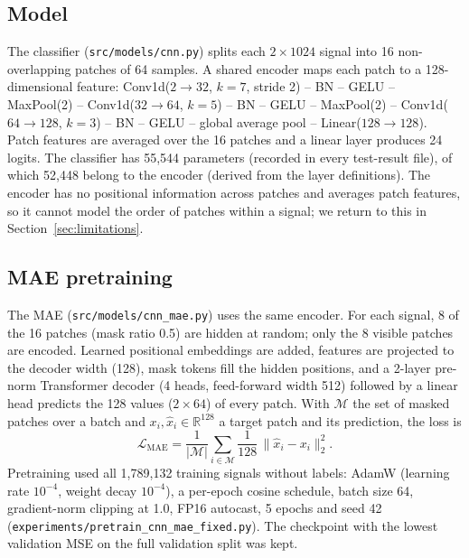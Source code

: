 \documentclass[11pt,a4paper]{article}
\begin{document}
\subsection{Model}
The classifier (\texttt{src/models/cnn.py}) splits each $2\times1024$ signal into 16 non-overlapping patches of 64 samples. A shared encoder maps each patch to a 128-dimensional feature:
Conv1d($2\!\to\!32$, $k{=}7$, stride 2) -- BN -- GELU -- MaxPool(2) -- Conv1d($32\!\to\!64$, $k{=}5$) -- BN -- GELU -- MaxPool(2) -- Conv1d($64\!\to\!128$, $k{=}3$) -- BN -- GELU -- global average pool -- Linear($128\!\to\!128$).
Patch features are averaged over the 16 patches and a linear layer produces 24 logits. The classifier has 55,544 parameters (recorded in every test-result file), of which 52,448 belong to the encoder (derived from the layer definitions).
The encoder has no positional information across patches and averages patch features, so it cannot model the order of patches within a signal; we return to this in Section~\ref{sec:limitations}.

\subsection{MAE pretraining}
The MAE (\texttt{src/models/cnn\_mae.py}) uses the same encoder. For each signal, 8 of the 16 patches (mask ratio 0.5) are hidden at random; only the 8 visible patches are encoded. Learned positional embeddings are added, features are projected to the decoder width (128), mask tokens fill the hidden positions, and a 2-layer pre-norm Transformer decoder (4 heads, feed-forward width 512) followed by a linear head predicts the 128 values ($2\times64$) of every patch. With $\mathcal{M}$ the set of masked patches over a batch and $x_i,\hat{x}_i\in\mathbb{R}^{128}$ a target patch and its prediction, the loss is
\begin{equation}
\mathcal{L}_{\text{MAE}} = \frac{1}{|\mathcal{M}|}\sum_{i\in\mathcal{M}} \frac{1}{128}\,\lVert \hat{x}_i - x_i\rVert_2^2 .
\end{equation}
Pretraining used all 1,789,132 training signals without labels: AdamW (learning rate $10^{-4}$, weight decay $10^{-4}$), a per-epoch cosine schedule, batch size 64, gradient-norm clipping at 1.0, FP16 autocast, 5 epochs and seed 42 (\texttt{experiments/pretrain\_cnn\_mae\_fixed.py}). The checkpoint with the lowest validation MSE on the full validation split was kept.
\end{document}
